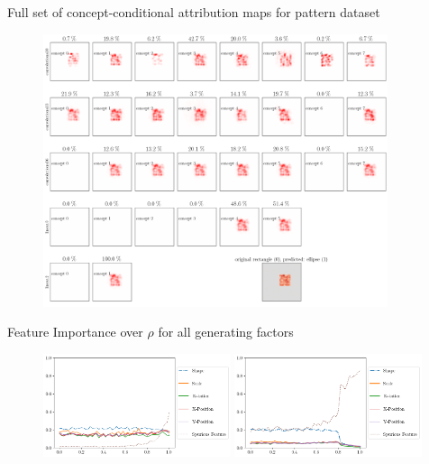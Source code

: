 \documentclass[German, aspectratio=169]{beamer}
\begin{document}
\begin{frame}[noframenumbering]
    Full set of concept-conditional attribution maps for pattern dataset
    \begin{figure}[t!]
        \centering
        \includegraphics[width=0.9\textwidth]{images/attributions_pattern2.png}
        \label{fig:attributions_pattern2}
    \end{figure}
\end{frame}
\begin{frame}[noframenumbering]
    Feature Importance over $\rho$ for all generating factors
    \begin{figure}[t!]
        \centering
        \includegraphics[width=0.49\textwidth]{images/relevance_all_factors.png}
        \includegraphics[width=0.49\textwidth]{images/relevance_all_factors_overlap.png}
        \label{fig:relevance_all_factors}
    \end{figure}
\end{frame}
\end{document}

